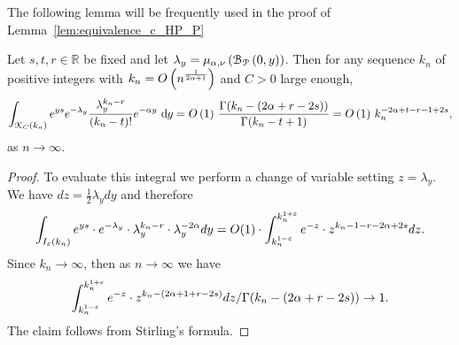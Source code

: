 The following lemma will be frequently used in the proof of Lemma~\ref{lem:equivalence_c_HP_P}
\begin{lemma} \label{eq:gamma_approx}
Let $s, t, r \in \mathbb{R}$ be fixed and let $\lambda_y = \mu_{\alpha,\nu}\left({\mathcal B}_{{\mathcal P}}\left(0,y\right)\right)$. Then for any sequence $k_n$ of positive integers with $k_n = O\left(n^{\frac{1}{2\alpha + 1}}\right)$ and $C > 0$ large enough,
\[
	\int_{{\mathcal K}_{C}(k_n)} e^{ys} e^{-\lambda_y} \frac{\lambda_y^{k_n-r}}{(k_n-t)!}e^{-\alpha y} \operatorname{\, \mathrm{d}\hspace{-2pt}} y =
	O\left(1\right) \, \frac{\Gamma (k_n- (2\alpha +r -2s))}{\Gamma(k_n-t+1)} = O\left(1\right) \, k_n^{-2\alpha+t-r-1+ 2s},
\]
as $n \to \infty$.
\end{lemma}
\begin{proof}
To evaluate this integral we perform a change of variable setting $z=\lambda_y$. 
We have $dz =\frac{1}{2} \lambda_y dy$ and therefore 
\begin{equation} \label{eq:gamma_approx_I}
 \int_{I_\varepsilon (k_n)} e^{ys} \cdot e^{-\lambda_y} \cdot \lambda_y^{k_n-r} \cdot \lambda_y^{-2\alpha}  dy = O(1) \cdot \int_{k_n^{1-\varepsilon}}^{k_n^{1+\varepsilon}} e^{-z} \cdot z^{k_n-1-r-2\alpha+2s}  dz. 
 \end{equation}
Since $k_n\to \infty$, then as $n\to \infty$ we have 
\begin{equation} \label{eq:gamma_approx_II}
\int_{k_n^{1-\varepsilon}}^{k_n^{1+\varepsilon}} e^{-z} \cdot z^{k_n-(2\alpha+1+r-2s)}  dz / \Gamma (k_n-(2\alpha+r -2s)) \to 1.
\end{equation}
The claim follows from Stirling's formula.
\end{proof}



